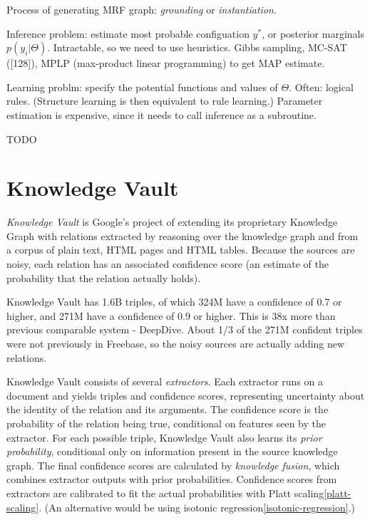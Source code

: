 Process of generating MRF graph: \textit{grounding} or \textit{instantiation}.

Inference problem: estimate most probable configuation $y^*$, or posterior
marginals $p(y_i|\Theta)$. Intractable, so we need to use heuristics.
Gibbs sampling, MC-SAT ([128]), MPLP (max-product linear programming) to get
MAP estimate.

Learning problm: specify the potential functions and values of $\Theta$.
Often: logical rules. (Structure learning is then equivalent to rule learning.)
Parameter estimation is expensive, since it needs to call inference as a
subroutine.

TODO

\section{Knowledge Vault}
\label{knowledge-vault}

\textit{Knowledge Vault}\cite{knowledge-vault} is Google's project of extending
its proprietary Knowledge Graph with relations extracted by reasoning over
the knowledge graph and from a corpus of plain text, HTML pages and HTML
tables. Because the sources are noisy, each relation has an associated
confidence score (an estimate of the probability that the relation actually
holds).

Knowledge Vault has 1.6B triples, of which 324M have a confidence of 0.7 or
higher, and 271M have a confidence of 0.9 or higher.
This is 38x more than previous comparable system - DeepDive.
About 1/3 of the 271M confident triples were not previously in Freebase, so
the noisy sources are actually adding new relations.

Knowledge Vault consists of several \textit{extractors}. Each extractor runs on a
document and yields triples and confidence scores, representing uncertainty
about the identity of the relation and its arguments. The confidence score is
the probability of the relation being true, conditional on features seen by
the extractor.
For each possible triple, Knowledge Vault also learns its \textit{prior
probability}, conditional only on information present in the source knowledge
graph.
The final confidence scores are calculated by \textit{knowledge fusion},
which combines extractor outputs with prior probabilities.
Confidence scores from extractors are calibrated to fit the actual probabilities
with Platt scaling\ref{platt-scaling}.
(An alternative would be using isotonic regression\ref{isotonic-regression}.)

